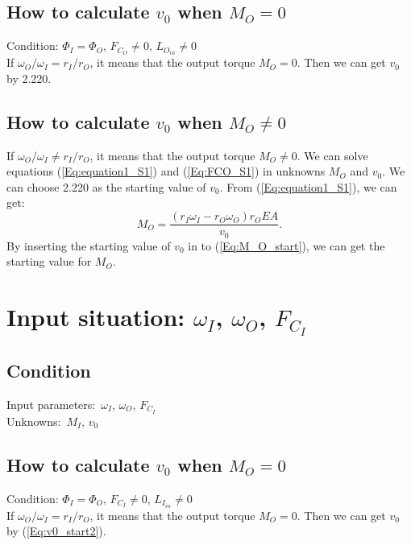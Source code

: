 \documentclass[a4paper,fleqn,13pt]{article}
\begin{document}
\subsection{How to calculate $v_0$ when $M_O = 0$}
Condition: $\Phi_I=\Phi_O$, $F_{C_O} \not = 0$, $L_{O_{in}} \neq 0$  \\

If $\omega_O / \omega_I = r_I/r_O$, it means that the output torque $M_O = 0$. Then we can get $v_0$ by 2.220.

\subsection{How to calculate $v_0$ when $M_O \not = 0$ }
If $\omega_O / \omega_I \neq r_I/r_O$, it means that the output torque $M_O \neq 0$. We can solve equations (\ref{Eq:equation1_S1}) and (\ref{Eq:FCO_S1}) in unknowns $M_O$ and $v_0$.
We can choose 2.220 as the starting value of $v_0$.
From (\ref{Eq:equation1_S1}), we can get:
\begin{equation}  \label{Eq:M_O_start}
  M_O = \frac{(r_I \omega_I - r_O \omega_O)r_O E A} {v_0}.
\end{equation}
By inserting the starting value of $v_0$ in to (\ref{Eq:M_O_start}), we can get the starting value for $M_O$.



\section{Input situation: $\omega_I$, $\omega_O$, $F_{C_I}$}

\subsection{Condition}
Input parameters:\ $\omega_I$, $\omega_O$, $F_{C_I}$ \\
Unknowns:\ $M_I$, $v_0$

\subsection{How to calculate $v_0$ when $M_O = 0$}
Condition: $\Phi_I=\Phi_O$, $F_{C_I} \not = 0$, $L_{I_{in}} \neq 0$  \\

If $\omega_O / \omega_I = r_I/r_O$, it means that the output torque $M_O = 0$. Then we can get $v_0$ by (\ref{Eq:v0_start2}).
\end{document}
